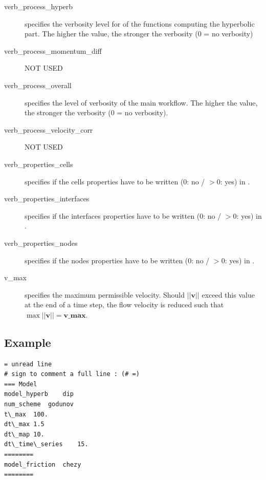 \begin{description}
\item[verb\_process\_hyperb] specifies the verbosity level for of the functions computing the hyperbolic part. The higher the value, the stronger the verbosity (0 = no verbosity)

\item[verb\_process\_momentum\_diff]  NOT USED

\item[verb\_process\_overall] specifies the level of verbosity of the main workflow. The higher the value, the stronger the verbosity (0 = no verbosity).

\item[verb\_process\_velocity\_corr]  NOT USED


\item[verb\_properties\_cells] specifies if the cells properties have to be written (0: no / $>0$: yes) in .

\item[verb\_properties\_interfaces] specifies if the interfaces properties have to be written (0: no / $>0$: yes) in .

\item[verb\_properties\_nodes] specifies if the nodes properties have to be written (0: no / $>0$: yes) in .


\item[v\_max]  specifies the maximum permissible velocity. Should $||\mathbf{v}||$ exceed this value at the end of a time step, the flow velocity is reduced such that $\max ||\mathbf{v}|| = \mathbf{v\_max} $.



\end{description}

\subsection{Example}
\begin{verbatim}
= unread line
# sign to comment a full line : (# =)
=== Model
model_hyperb	dip
num_scheme	godunov
t\_max	100.
dt\_max	1.5
dt\_map	10.
dt\_time\_series	15.
========
model_friction	chezy
========
\end{verbatim}
